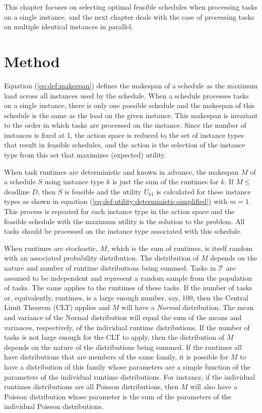 \documentclass[12pt]{report}
\begin{document}
This chapter focuses on selecting optimal feasible schedules when processing tasks on a single instance, and the next chapter deals with the case of processing tasks on multiple identical instances in parallel.

\section{Method}

Equation (\ref{eq:def:makespan}) defines the makespan of a schedule as the maximum load across all instances used by the schedule.
When a schedule processes tasks on a single instance, there is only one possible schedule and the makespan of this schedule is the same as the load on the given instance.
This makespan is invariant to the order in which tasks are processed on the instance.
Since the number of instances is fixed at 1, the action space is reduced to the set of instance types that result in feasible schedules, and the action is the selection of the instance type from this set that maximizes (expected) utility.

When task runtimes are deterministic and known in advance, the makespan $M$ of a schedule $S$ using instance type $k$ is just the sum of the runtimes for $k$.
If $M \le $ deadline $D$, then $S$ is feasible and the utility $U_{k1}$ is calculated for these instance types as shown in equation (\ref{eq:def:utility:deterministic:simplified}) with $m=1$.
This process is repeated for each instance type in the action space and the feasible schedule with the maximum utility is the solution to the problem.
All tasks should be processed on the instance type associated with this schedule.

When runtimes are stochastic, $M$, which is the sum of runtimes, is itself random with an associated probability distribution.
The distribution of $M$ depends on the nature and number of runtime distributions being summed.
Tasks in $\mathcal{T}$ are assumed to be independent and represent a random sample from the population of tasks.
The same applies to the runtimes of these tasks.
If the number of tasks or, equivalently, runtimes, is a large enough number, say, 100, then the Central Limit Theorem (CLT) applies and $M$ will have a \textit{Normal} distribution.
The mean and variance of the Normal distribution will equal the sum of the means and variances, respectively, of the individual runtime distributions.
If the number of tasks is not large enough for the CLT to apply, then the distribution of $M$ depends on the nature of the distributions being summed.
If the runtimes all have distributions that are members of the same family, it is possible for $M$ to have a distribution of this family whose parameters are a simple function of the parameters of the individual runtime distributions.
For instance, if the individual runtimes distributions are all Poisson distributions, then $M$ will also have a Poisson distribution whose parameter is the sum of the parameters of the individual Poisson distributions.
\end{document}
